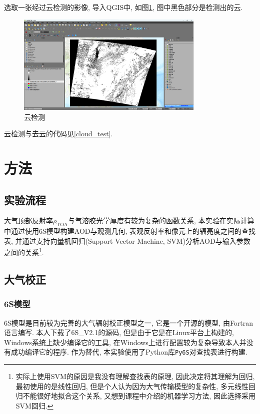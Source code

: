 \documentclass{ctexart}
\begin{document}
\begin{sloppypar}
选取一张经过云检测的影像, 导入QGIS中, 如图\ref{cloud-test}, 图中黑色部分是检测出的云. 
\begin{figure}[h]\centering
\includegraphics[width=0.8\textwidth]{./src/cloud-test.png}\caption{云检测}\label{cloud-test}
\end{figure}

云检测与去云的代码见\ref{cloud_test}.

\section{方法}
\subsection{实验流程}
大气顶部反射率$\rho_{\mathrm{TOA}}$与气溶胶光学厚度有较为复杂的函数关系\cite{KaufmanTanri-708, 孙林于会泳-709}, 
本实验在实际计算中通过使用6S模型构建AOD与观测几何, 表观反射率和像元上的辐亮度之间的查找表, 并通过支持向量机回归(Support Vector Machine, SVM)分析AOD与输入参数之间的关系\footnote{实际上使用SVM的原因是我没有理解查找表的原理, 因此决定将其理解为回归, 最初使用的是线性回归, 但是个人认为因为大气传输模型的复杂性, 多元线性回归不能很好地拟合这个关系, 又想到课程中介绍的机器学习方法, 因此选择采用SVM回归.\label{process}}. 

\subsection{大气校正}
\subsubsection{6S模型}\label{6s}
6S模型是目前较为完善的大气辐射校正模型之一, 它是一个开源的模型, 由Fortran语言编写. 本人下载了6S\_V2.1的源码, 但是由于它是在Linux平台上构建的, Windows系统上缺少编译它的工具, 在Windows上进行配置较为复杂导致本人并没有成功编译它的程序. 
作为替代, 本实验使用了Python库\verb|Py6S|\cite{581987,WILSON2013166}对查找表进行构建. 


\end{sloppypar}
\end{document}
